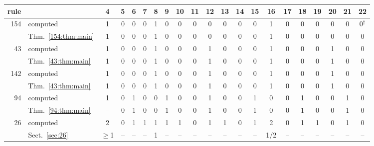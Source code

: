 \begin{tabular}{@{}rl*{19}{c}@{}}
\hline
rule & & 4 & 5 & 6 & 7 & 8 & 9 & 10 & 11 & 12 & 13 & 14 & 15 & 16 & 17 & 18 & 19 & 20 & 21 & 22 \\
\hline
154 & computed & 1 & 0 & 0 & 0 & 1 & 0 & 0 & 0 & 0 & 0 & 0 & 0 & 1 & 0 & 0 & 0 & 0 & 0 & 0$^\dagger$ \\
 & Thm.~\ref{154:thm:main} & 1 & 0 & 0 & 0 & 1 & 0 & 0 & 0 & 0 & 0 & 0 & 0 & 1 & 0 & 0 & 0 & 0 & 0 & 0 \\
\hline
43 & computed & 1 & 0 & 0 & 0 & 1 & 0 & 0 & 0 & 1 & 0 & 0 & 0 & 1 & 0 & 0 & 0 & 1 & 0 & 0 \\
 & Thm.~\ref{43:thm:main} & 1 & 0 & 0 & 0 & 1 & 0 & 0 & 0 & 1 & 0 & 0 & 0 & 1 & 0 & 0 & 0 & 1 & 0 & 0 \\
\hline
142 & computed & 1 & 0 & 0 & 0 & 1 & 0 & 0 & 0 & 1 & 0 & 0 & 0 & 1 & 0 & 0 & 0 & 1 & 0 & 0 \\
 & Thm.~\ref{43:thm:main} & 1 & 0 & 0 & 0 & 1 & 0 & 0 & 0 & 1 & 0 & 0 & 0 & 1 & 0 & 0 & 0 & 1 & 0 & 0 \\
\hline
94 & computed & 1 & 0 & 1 & 0 & 0 & 1 & 0 & 0 & 1 & 0 & 0 & 1 & 0 & 0 & 1 & 0 & 0 & 1 & 0 \\
 & Thm.~\ref{94:thm:main} & -- & 0 & 1 & 0 & 0 & 1 & 0 & 0 & 1 & 0 & 0 & 1 & 0 & 0 & 1 & 0 & 0 & 1 & 0 \\
\hline
26 & computed & 2 & 0 & 1 & 1 & 1 & 1 & 1 & 0 & 1 & 1 & 0 & 1 & 2 & 0 & 1 & 1 & 0 & 1 & 0 \\
 & Sect.~\ref{sec:26} & $\ge$1 & -- & -- & -- & 1 & -- & -- & -- & -- & -- & -- & -- & 1/2 & -- & -- & -- & -- & -- & -- \\
\hline
\end{tabular}
